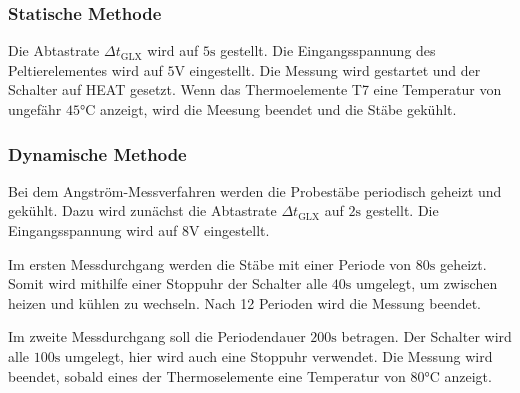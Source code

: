 \subsubsection{Statische Methode}
\label{subsubsec:statisch}
Die Abtastrate $\Delta t_\text{GLX}$ wird auf $5\si{\second}$ gestellt.
Die Eingangsspannung des Peltierelementes wird auf $5\si{\volt}$ eingestellt.
Die Messung wird gestartet und der Schalter auf HEAT gesetzt.
Wenn das Thermoelemente T7 eine Temperatur von ungefähr $45\si{\celsius}$ anzeigt,
wird die Meesung beendet und die Stäbe gekühlt.
\subsubsection{Dynamische Methode}
\label{subsubsec:dynamisch}
Bei dem Angström-Messverfahren werden die Probestäbe periodisch geheizt und gekühlt.
Dazu wird zunächst die Abtastrate $\Delta t_\text{GLX}$ auf $2\si{\second}$ gestellt.
Die Eingangsspannung wird auf $8\si{\volt}$ eingestellt.

Im ersten Messdurchgang werden die Stäbe mit einer Periode von $80\si{\second}$ geheizt.
Somit wird mithilfe einer Stoppuhr der Schalter alle $40\si{\second}$ umgelegt, um zwischen heizen und kühlen zu wechseln.
Nach 12 Perioden wird die Messung beendet.

Im zweite Messdurchgang soll die Periodendauer $200\si{\second}$ betragen.
Der Schalter wird alle $100\si{\second}$ umgelegt, hier wird auch eine Stoppuhr verwendet.
Die Messung wird beendet, sobald eines der Thermoselemente eine Temperatur von $80\si{\celsius}$ anzeigt.